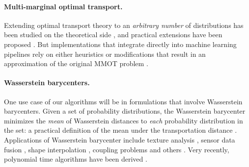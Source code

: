 \paragraph{Multi-marginal optimal transport.}
Extending optimal transport theory to an {\em arbitrary number} of distributions has been 
studied on the theoretical side \citep{pass2015multi}, and practical extensions have been proposed \citep{mmotcuturi}. But implementations that integrate directly into machine learning pipelines rely on either heuristics or modifications that result in an approximation of the original MMOT problem \citep{cao2019multi}.

\paragraph{Wasserstein barycenters.}
One use case of our algorithms will be in 
formulations that involve Wasserstein barycenters. 
Given a set of probability distributions, the Wasserstein barycenter minimizes 
the {\em mean} of Wasserstein
distances to {\em each} probability distribution in the set: a practical definition of the mean under the transportation distance  \citep{sinkbaryfw,fastbary,agueh2011barycenters,janati2020debiased}. 
Applications of Wasserstein barycenter  
include texture analysis \citep{rabin2011wasserstein}, sensor data fusion \citep{elvander2020multi}, shape interpolation \citep{solomon2015convolutional}, coupling problems \citep{ruschendorf2002n} and others \citep{ho2017multilevel}. Very recently, polynomial time algorithms have been derived  \citep{altschuler2021wasserstein}. 

